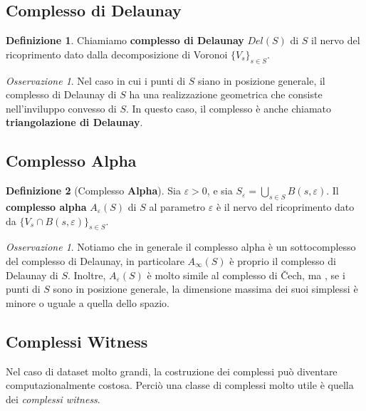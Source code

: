 \documentclass[a4paper, 12pt]{article}
\theoremstyle{definition}
\newtheorem{definition}{Definizione}[section]
\theoremstyle{remark}
\newtheorem{remark}[theorem]{Osservazione}
\begin{document}
\subsection*{Complesso di Delaunay}
\begin{definition}
    Chiamiamo \textbf{complesso di Delaunay} $Del(S)$ di $S$ il nervo del ricoprimento dato dalla decomposizione di Voronoi $\{V_s\}_{s \in S}$.
\end{definition}

\begin{remark}
    Nel caso in cui i punti di $S$ siano in posizione generale, il complesso di Delaunay di $S$ ha una realizzazione geometrica che consiste nell'inviluppo convesso di $S$. In questo caso, il complesso è anche chiamato \textbf{triangolazione di Delaunay}.
\end{remark}



\subsection*{Complesso Alpha}
\begin{definition}[Complesso \textbf{Alpha}]
    Sia $\varepsilon > 0$, e sia $S_{\varepsilon} = \bigcup_{s \in S} B(s, \varepsilon)$. Il \textbf{complesso alpha} $A_{\varepsilon}(S)$ di $S$ al parametro $\varepsilon$ è il nervo del ricoprimento dato da $\{V_s \cap B(s, \varepsilon)\}_{s \in S}$. 
\end{definition}



\begin{remark}
    Notiamo che in generale il complesso alpha è un sottocomplesso del complesso di Delaunay, in particolare $A_{\infty}(S)$ è proprio il complesso di Delaunay di $S$.
    Inoltre, $A_{\varepsilon}(S)$ è molto simile al complesso di \v{C}ech, ma , se i punti di $S$ sono in posizione generale, la dimensione massima dei suoi simplessi è minore o uguale a quella dello spazio.
\end{remark}

\subsection*{Complessi Witness}
Nel caso di dataset molto grandi, la costruzione dei complessi può diventare computazionalmente costosa. Perciò una classe di complessi molto utile è quella dei \textit{complessi witness}.
\end{document}
